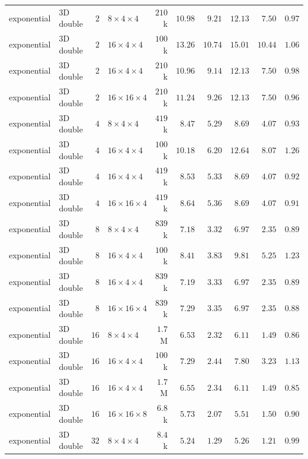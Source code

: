 {\begin{longtable}{llrlrrrrrr}
    exponential & 3D double & $2$ & $8{\times}4{\times}4$ & $210$k & $10.98$ & $9.21$ & $12.13$ & $7.50$ & $0.97$ \\
    exponential & 3D double & $2$ & $16{\times}4{\times}4$ & $100$k & $13.26$ & $10.74$ & $15.01$ & $10.44$ & $1.06$ \\
    exponential & 3D double & $2$ & $16{\times}4{\times}4$ & $210$k & $10.96$ & $9.14$ & $12.13$ & $7.50$ & $0.98$ \\
    exponential & 3D double & $2$ & $16{\times}16{\times}4$ & $210$k & $11.24$ & $9.26$ & $12.13$ & $7.50$ & $0.96$ \\
    exponential & 3D double & $4$ & $8{\times}4{\times}4$ & $419$k & $8.47$ & $5.29$ & $8.69$ & $4.07$ & $0.93$ \\
    exponential & 3D double & $4$ & $16{\times}4{\times}4$ & $100$k & $10.18$ & $6.20$ & $12.64$ & $8.07$ & $1.26$ \\
    exponential & 3D double & $4$ & $16{\times}4{\times}4$ & $419$k & $8.53$ & $5.33$ & $8.69$ & $4.07$ & $0.92$ \\
    exponential & 3D double & $4$ & $16{\times}16{\times}4$ & $419$k & $8.64$ & $5.36$ & $8.69$ & $4.07$ & $0.91$ \\
    exponential & 3D double & $8$ & $8{\times}4{\times}4$ & $839$k & $7.18$ & $3.32$ & $6.97$ & $2.35$ & $0.89$ \\
    exponential & 3D double & $8$ & $16{\times}4{\times}4$ & $100$k & $8.41$ & $3.83$ & $9.81$ & $5.25$ & $1.23$ \\
    exponential & 3D double & $8$ & $16{\times}4{\times}4$ & $839$k & $7.19$ & $3.33$ & $6.97$ & $2.35$ & $0.89$ \\
    exponential & 3D double & $8$ & $16{\times}16{\times}4$ & $839$k & $7.29$ & $3.35$ & $6.97$ & $2.35$ & $0.88$ \\
    exponential & 3D double & $16$ & $8{\times}4{\times}4$ & $1.7$M & $6.53$ & $2.32$ & $6.11$ & $1.49$ & $0.86$ \\
    exponential & 3D double & $16$ & $16{\times}4{\times}4$ & $100$k & $7.29$ & $2.44$ & $7.80$ & $3.23$ & $1.13$ \\
    exponential & 3D double & $16$ & $16{\times}4{\times}4$ & $1.7$M & $6.55$ & $2.34$ & $6.11$ & $1.49$ & $0.85$ \\
    exponential & 3D double & $16$ & $16{\times}16{\times}8$ & $6.8$k & $5.73$ & $2.07$ & $5.51$ & $1.50$ & $0.90$ \\
    exponential & 3D double & $32$ & $8{\times}4{\times}4$ & $8.4$k & $5.24$ & $1.29$ & $5.26$ & $1.21$ & $0.99$ \\

\end{longtable}}
